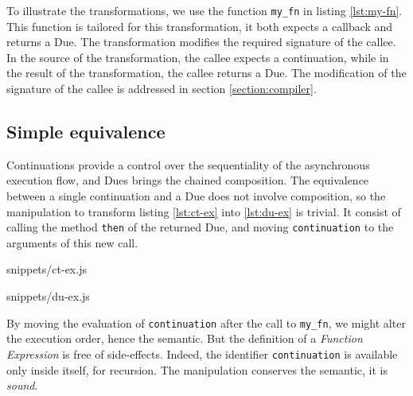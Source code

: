 To illustrate the transformations, we use the function \texttt{my_fn} in listing \ref{lst:my-fn}.
This function is tailored for this transformation, it both expects a callback and returns a Due.
The transformation modifies the required signature of the callee.
In the source of the transformation, the callee expects a continuation, while in the result of the transformation, the callee returns a Due.
The modification of the signature of the callee is addressed in section \ref{section:compiler}.



\subsection{Simple equivalence} \label{section:equivalence:simple}


Continuations provide a control over the sequentiality of the asynchronous execution flow, and Dues brings the chained composition.
The equivalence between a single continuation and a Due does not involve composition, so the manipulation to transform listing \ref{lst:ct-ex} into \ref{lst:du-ex} is trivial.
It consist of calling the method \texttt{then} of the returned Due, and moving \texttt{continuation} to the arguments of this new call.

             {snippets/ct-ex.js}

             {snippets/du-ex.js}

By moving the evaluation of \texttt{continuation} after the call to \texttt{my_fn}, we might alter the execution order, hence the semantic.
But the definition of a \textit{Function Expression} is free of side-effects.
Indeed, the identifier \texttt{continuation} is available only inside itself, for recursion.
The manipulation conserves the semantic, it is \textit{sound}.

